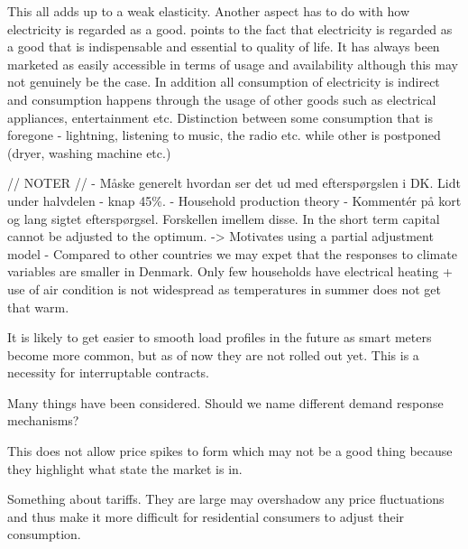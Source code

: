  

This all adds up to a weak elasticity. Another aspect has to do with how electricity is regarded as a good. \citep{kirschen2003demand} points to the fact that electricity is regarded as a good that is indispensable and essential to quality of life. It has always been marketed as easily accessible in terms of usage and availability although this may not genuinely be the case. In addition all consumption of electricity is indirect and consumption happens through the usage of other goods such as electrical appliances, entertainment etc. Distinction between some consumption that is foregone - lightning, listening to music, the radio etc. while other is postponed (dryer, washing machine etc.) 


// NOTER // 
- Måske generelt hvordan ser det ud med efterspørgslen i DK. Lidt under halvdelen - knap 45\%. 
- Household production theory 
- Kommentér på kort og lang sigtet efterspørgsel. Forskellen imellem disse. In the short term capital cannot be adjusted to the optimum. -> Motivates using a partial adjustment model  
- Compared to other countries we may expet that the responses to climate variables are smaller in Denmark. Only few households have electrical heating + use of air condition is not widespread as temperatures in summer does not get that warm. 

It is likely to get easier to smooth load profiles in the future as smart meters become more common, but as of now they are not rolled out yet. This is a necessity for interruptable contracts. 


Many things have been considered. Should we name different demand response mechanisms? 

This does not allow price spikes to form which may not be a good thing because they highlight what state the market is in. 

Something about tariffs. They are large may overshadow any price fluctuations and thus make it more difficult for residential consumers to adjust their consumption. 

\citep{kirschen2003demand}
 



